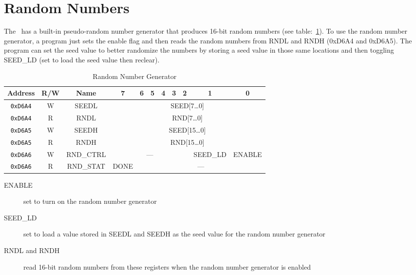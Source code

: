 \section*{Random Numbers}

The \jr\ has a built-in pseudo-random number generator that produces 16-bit random numbers (see table:~\ref{tab:rng_reg}). To use the random number generator, a program just sets the enable flag and then reads the random numbers from RNDL and RNDH (0xD6A4 and 0xD6A5). The program can set the seed value to better randomize the numbers by storing a seed value in those same locations and then toggling SEED\_LD (set to load the seed value then reclear).

\begin{table}[ht]
    \begin{center}
        \begin{tabular}{|c|c|c|c|c|c|c|c|c|c|c|} \hline
            Address & R/W & Name & 7 & 6 & 5 & 4 & 3 & 2 & 1 & 0 \\\hline\hline
            \verb+0xD6A4+ & W & SEEDL & \multicolumn{8}{|c|}{SEED[7\ldots 0]} \\ \hline
            \verb+0xD6A4+ & R & RNDL & \multicolumn{8}{|c|}{RND[7\ldots 0]} \\ \hline
            \verb+0xD6A5+ & W & SEEDH & \multicolumn{8}{|c|}{SEED[15\ldots 0]} \\ \hline
            \verb+0xD6A5+ & R & RNDH &  \multicolumn{8}{|c|}{RND[15\ldots 0]} \\ \hline

            \verb+0xD6A6+ & W & RND\_CTRL & \multicolumn{6}{|c|}{---} & SEED\_LD & ENABLE \\ \hline
            \verb+0xD6A6+ & R & RND\_STAT & DONE & \multicolumn{7}{|c|}{---} \\ \hline

        \end{tabular}
    \end{center}
    \caption{Random Number Generator}
    \label{tab:rng_reg}
\end{table}

\begin{description}
    \item[ENABLE] set to turn on the random number generator

    \item[SEED\_LD] set to load a value stored in SEEDL and SEEDH as the seed value for the random number generator

    \item[RNDL and RNDH] read 16-bit random numbers from these registers when the random number generator is enabled
\end{description}

